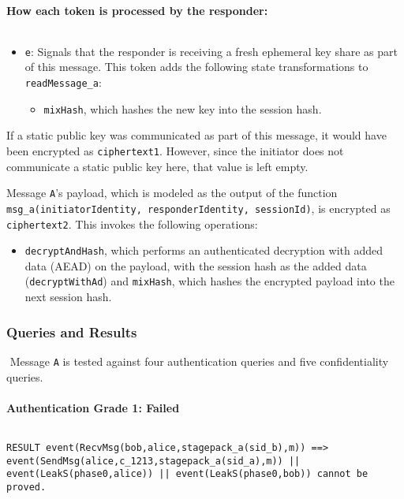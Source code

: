 \paragraph{How each token is processed by the responder:}$ $

\begin{itemize}

\item \texttt{e}: Signals that the responder is receiving a fresh ephemeral key share as part of this message. This token adds the following state transformations to \texttt{readMessage\_a}:
\begin{itemize}

\item \texttt{mixHash}, which hashes the new key into the session hash.
\end{itemize}


\end{itemize}
If a static public key was communicated as part of this message, it would have been encrypted as \texttt{ciphertext1}. However, since the initiator does not communicate a static public key here, that value is left empty.


Message \texttt{A}'s payload, which is modeled as the output of the function \texttt{msg\_a(initiatorIdentity, responderIdentity, sessionId)}, is encrypted as \texttt{ciphertext2}. This invokes the following operations:


\begin{itemize}

\item \texttt{decryptAndHash}, which performs an authenticated decryption with added data (AEAD) on the payload, with the session hash as the added data (\texttt{decryptWithAd}) and \texttt{mixHash}, which hashes the encrypted payload into the next session hash.

\end{itemize}
\subsubsection{Queries and Results}$ $
Message \texttt{A} is tested against four authentication queries and five confidentiality queries.
\paragraph{Authentication Grade 1: Failed}$ $
\begin{lstlisting}
RESULT event(RecvMsg(bob,alice,stagepack_a(sid_b),m)) ==> event(SendMsg(alice,c_1213,stagepack_a(sid_a),m)) || event(LeakS(phase0,alice)) || event(LeakS(phase0,bob)) cannot be proved.
\end{lstlisting}

